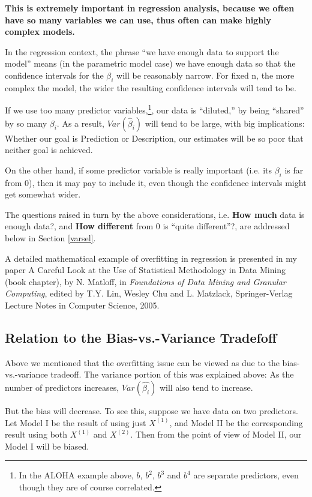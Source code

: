 {\bf This is extremely important in regression analysis, because we
often have so many variables we can use, thus often can make highly
complex models.}  

In the regression context, the phrase ``we have enough data to support
the model'' means (in the parametric model case) we have enough data so
that the confidence intervals for the $\beta_i$ will be reasonably
narrow.  For fixed n, the more complex the model, the wider the
resulting confidence intervals will tend to be.

If we use too many predictor variables,\footnote{In the ALOHA example
above, $b$, $b^2$, $b^3$ and $b^4$ are separate predictors, even though
they are of course correlated.}, our data is ``diluted,'' by being
``shared'' by so many $\beta_i$.  As a result, $Var(\widehat{\beta}_i)$
will tend to be large, with big implications:  Whether our goal is
Prediction or Description, our estimates will be so poor that neither
goal is achieved.  

On the other hand, if some predictor variable is really important (i.e.
its $\beta_i$ is far from 0), then it may pay to include it, even though
the confidence intervals might get somewhat wider.

The questions raised in turn by the above considerations, i.e. {\bf How
much} data is enough data?, and {\bf How different} from 0 is ``quite
different''?, are addressed below in Section \ref{varsel}.

A detailed mathematical example of overfitting in regression is
presented in my paper A Careful Look at the Use of Statistical
Methodology in Data Mining (book chapter), by N. Matloff, in {\it
Foundations of Data Mining and Granular Computing}, edited by T.Y. Lin,
Wesley Chu and L. Matzlack, Springer-Verlag Lecture Notes in Computer
Science, 2005.

\subsection{Relation to the Bias-vs.-Variance Tradefoff}

Above we mentioned that the overfitting issue can be viewed as due to
the bias-vs.-variance tradeoff.  The variance portion of this was
explained above:  As the number of predictors increases,
$Var(\widehat{\beta_i})$ will also tend to increase.

But the bias will decrease.  To see this, suppose we have data on two
predictors.  Let Model I be the result of using just $X^{(1)}$, and
Model II be the corresponding result using both $X^{(1)}$ and $X^{(2)}$.
Then from the point of view of Model II, our Model I will be biased.

